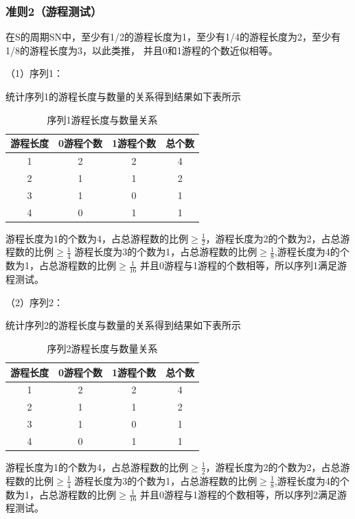 \documentclass[a4paper,11pt,UTF8]{ctexart}
\begin{document}
    \subsubsection{准则2（游程测试）}
      在S的周期SN中，至少有1/2的游程长度为1，至少有1/4的游程长度为2，至少有1/8的游程长度为3，以此类推，
      并且0和1游程的个数近似相等。\par
      （1）序列1：\par
        统计序列1的游程长度与数量的关系得到结果如下表所示
        \begin{table}[H]
          \begin{center}
            \caption{序列1游程长度与数量关系}
            \begin{tabular}{c|c|c|c} %
              \textbf{游程长度} & \textbf{0游程个数} & \textbf{1游程个数} & \textbf{总个数} \\
              \hline
              1  &2&2& 4 \\
              2  &1&1& 2  \\
              3  &1&0& 1 \\
              4  &0&1& 1  \\
            \end{tabular}
          \end{center}
        \end{table}
        游程长度为1的个数为4，占总游程数的比例$\ge \frac{1}{2}$，游程长度为2的个数为2，占总游程数的比例$\ge \frac{1}{4}$
        游程长度为3的个数为1，占总游程数的比例$\ge \frac{1}{8}$,游程长度为4的个数为1，占总游程数的比例$\ge \frac{1}{16}$
        并且0游程与1游程的个数相等，所以序列1满足游程测试。\par

      （2）序列2：\par
        统计序列2的游程长度与数量的关系得到结果如下表所示
        \begin{table}[H]
          \begin{center}
            \caption{序列2游程长度与数量关系}
            \begin{tabular}{c|c|c|c} %
              \textbf{游程长度} & \textbf{0游程个数} & \textbf{1游程个数} & \textbf{总个数} \\
              \hline
              1  &2&2& 4 \\
              2  &1&1& 2  \\
              3  &1&0& 1 \\
              4  &0&1& 1  \\
            \end{tabular}
          \end{center}
        \end{table}
        游程长度为1的个数为4，占总游程数的比例$\ge \frac{1}{2}$，游程长度为2的个数为2，占总游程数的比例$\ge \frac{1}{4}$
        游程长度为3的个数为1，占总游程数的比例$\ge \frac{1}{8}$,游程长度为4的个数为1，占总游程数的比例$\ge \frac{1}{16}$
        并且0游程与1游程的个数相等，所以序列2满足游程测试。
\newpage
\end{document}
